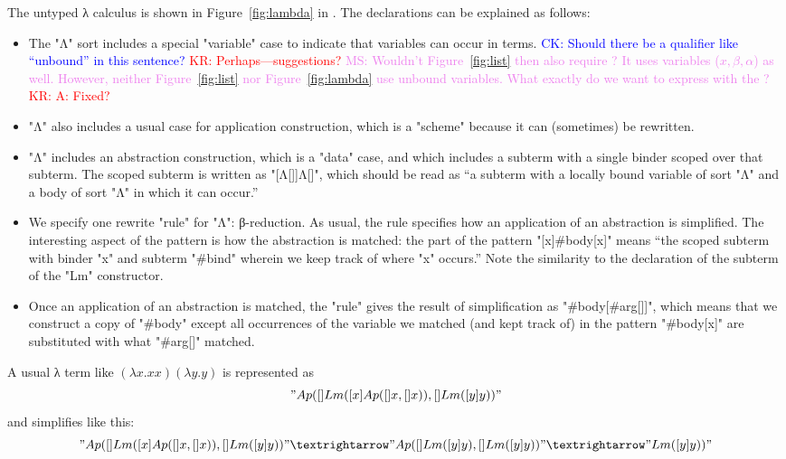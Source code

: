 \documentclass[letterpaper,11pt]{article}
\newcommand{\CK}[1]{\textcolor{blue}{CK: #1}}
\newcommand{\KR}[1]{\textcolor{red}{KR: #1}}
\newcommand{\MS}[1]{\textcolor{violet}{MS: #1}}
\begin{document}
\begin{example}\label{ex:lambda}
  The untyped λ calculus is shown in Figure~\ref{fig:lambda} in \hax.  The declarations can be
  explained as follows:
  \begin{itemize}

  \item The "Λ" sort includes a special "variable" case to indicate that variables can occur in
    terms. \CK{Should there be a qualifier like ``unbound'' in this sentence?}
    \KR{Perhaps---suggestions?} \MS{Wouldn't Figure~\ref{fig:list} then also require \kw{variable}?
      It uses variables ($x, \beta, \alpha$) as well. However, neither Figure~\ref{fig:list} nor
      Figure~\ref{fig:lambda} use unbound variables. What exactly do we want to express with the
      \kw{variable}?} \KR{A: Fixed?}

  \item "Λ" also includes a usual case for application construction, which is a "scheme" because it
    can (sometimes) be rewritten.

  \item "Λ" includes an abstraction construction, which is a "data" case, and which includes a
    subterm with a single binder scoped over that subterm. The scoped subterm is written as
    "[Λ[]]Λ[]", which should be read as ``a subterm with a locally bound variable of sort "Λ" and a
    body of sort "Λ" in which it can occur.''

  \item We specify one rewrite "rule" for "Λ": β-reduction. As usual, the rule specifies how an
    application of an abstraction is simplified. The interesting aspect of the pattern is how the
    abstraction is matched: the part of the pattern "[x]#body[x]" means ``the scoped subterm with
    binder "x" and subterm "#bind" wherein we keep track of where "x" occurs.'' Note the similarity
    to the declaration of the subterm of the "Lm" constructor.

  \item Once an application of an abstraction is matched, the "rule" gives the result of
    simplification as "#body[#arg[]]", which means that we construct a copy of "#body" except all
    occurrences of the variable we matched (and kept track of) in the pattern "#body[x]" are
    substituted with what "#arg[]" matched.

  \end{itemize}
  A usual λ term like $(λx.x x)(λy.y)$ is represented as
  \begin{displaymath}
    "Ap([]Lm([x]Ap([]x, []x)), []Lm([y]y))"    
  \end{displaymath}
  and simplifies like this:
  \begin{displaymath}
    "Ap([]Lm([x]Ap([]x, []x)), []Lm([y]y))" →
    "Ap([]Lm([y]y), []Lm([y]y))" →
    "Lm([y]y))"
  \end{displaymath}
\end{example}
\end{document}
